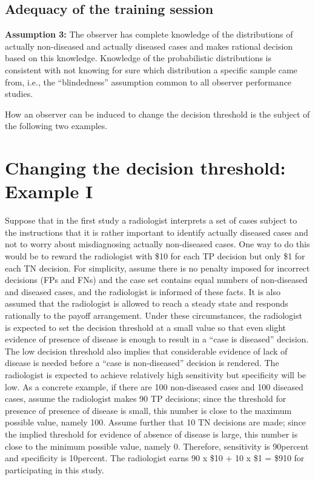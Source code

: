 \documentclass[
]{book}
\begin{document}
\hypertarget{adequacy-of-the-training-session}{%
\subsection{Adequacy of the training session}\label{adequacy-of-the-training-session}}

\textbf{Assumption 3:} The observer has complete knowledge of the distributions of actually non-diseased and actually diseased cases and makes rational decision based on this knowledge. Knowledge of the probabilistic distributions is consistent with not knowing for sure which distribution a specific sample came from, i.e., the ``blindedness'' assumption common to all observer performance studies.

How an observer can be induced to change the decision threshold is the subject of the following two examples.

\hypertarget{binary-task-model-example-1}{%
\section{Changing the decision threshold: Example I}\label{binary-task-model-example-1}}

Suppose that in the first study a radiologist interprets a set of cases subject to the instructions that it is rather important to identify actually diseased cases and not to worry about misdiagnosing actually non-diseased cases. One way to do this would be to reward the radiologist with \$10 for each TP decision but only \$1 for each TN decision. For simplicity, assume there is no penalty imposed for incorrect decisions (FPs and FNs) and the case set contains equal numbers of non-diseased and diseased cases, and the radiologist is informed of these facts. It is also assumed that the radiologist is allowed to reach a steady state and responds rationally to the payoff arrangement. Under these circumstances, the radiologist is expected to set the decision threshold at a small value so that even slight evidence of presence of disease is enough to result in a ``case is diseased'' decision. The low decision threshold also implies that considerable evidence of lack of disease is needed before a ``case is non-diseased'' decision is rendered. The radiologist is expected to achieve relatively high sensitivity but specificity will be low. As a concrete example, if there are 100 non-diseased cases and 100 diseased cases, assume the radiologist makes 90 TP decisions; since the threshold for presence of presence of disease is small, this number is close to the maximum possible value, namely 100. Assume further that 10 TN decisions are made; since the implied threshold for evidence of absence of disease is large, this number is close to the minimum possible value, namely 0. Therefore, sensitivity is 90percent and specificity is 10percent. The radiologist earns 90 x \$10 + 10 x \$1 = \$910 for participating in this study.
\end{document}
